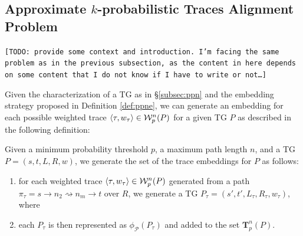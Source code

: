 \subsection{Approximate $k$-probabilistic Traces Alignment Problem}\label{subsec:akptap}
\texttt{\color{red}[TODO: provide some context and introduction. I'm facing the same problem as in the previous subsection, as the content in here depends on some content that I do not know if I have to write or not\dots]}

Given the characterization of a TG as in \S\ref{subsec:ppn} and the embedding strategy proposed in Definition \ref{def:ppne}, we can generate an embedding for each possible weighted trace $\braket{\tau,w_\tau}\in\mathcal{W}_p^n(P)$ for a given TG $P$ as described in the following definition:
\begin{definition}
Given a minimum probability threshold $p$, a maximum path length $n$, and a TG $P=(s,t,L,R,w)$, we generate the set of the trace embeddings for $P$ as follows:
\begin{enumerate}
	\item for each weighted trace $\braket{\tau,w_\tau}\in\mathcal{W}_p^n(P)$ generated from a path $\pi_\tau=s\to n_2\rightsquigarrow n_m\to t$ over $R$, we generate a TG $P_\tau=(s',t',L_\tau,R_\tau,w_\tau)$, where 
	\item each $P_\tau$ is then represented as $\phi_{\mathcal{P}}(P_\tau)$ and added to the set $\mathbf{T}_p^n(P)$.
\end{enumerate}
\end{definition}

